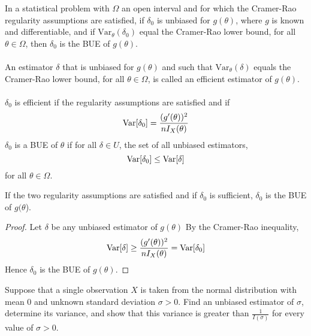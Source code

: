 \documentclass[12pt]{article}
\begin{document}
In a statistical problem with $\Omega$ an open interval and for which the Cramer-Rao regularity assumptions are satisfied, if $\delta_0$ is unbiased for $g(\theta)$, where $g$ is known and differentiable, and if $\mathrm{Var}_\theta(\delta_0)$ equal the Cramer-Rao lower bound, for all $\theta \in \Omega$, then $\delta_0$ is the BUE of $g(\theta)$. \\~\\
An estimator $\delta$ that is unbiased for $g(\theta)$ and such that $\mathrm{Var}_\theta(\delta)$ equals the Cramer-Rao lower bound, for all $\theta \in \Omega$, is called an efficient estimator of $g(\theta)$. \\~\\
$\delta_0$ is efficient if the regularity assumptions are satisfied and if $$ \mathrm{Var}[ \delta_0 ] = \frac{(g'(\theta))^2}{nI_X(\theta)} $$ $\delta_0$ is a BUE of $\theta$ if for all $\delta \in U$, the set of all unbiased estimators, $$\mathrm{Var}[ \delta_0 ] \leq \mathrm{Var}[ \delta ]$$ for all $\theta \in \Omega$. 
\begin{theorem} If the two regularity assumptions are satisfied and if $\delta_0$ is sufficient, $\delta_0$ is the BUE of $g(\theta$). \end{theorem} 
\begin{proof} Let $\delta$ be any unbiased estimator of $g(\theta)$ By the Cramer-Rao inequality, $$\mathrm{Var}[ \delta ] \geq \frac{(g'(\theta))^2}{nI_X(\theta)} = \mathrm{Var}[ \delta_0 ] $$ Hence $\delta_0$ is the BUE of $g(\theta)$. \end{proof} 
Suppose that a single observation $X$ is taken from the normal distribution with mean $0$ and unknown standard deviation $\sigma > 0$. Find an unbiased estimator of $\sigma$, determine its variance, and show that this variance is greater than $\frac{1}{I(\sigma)}$ for every value of $\sigma > 0$. \\ 
\end{document}
